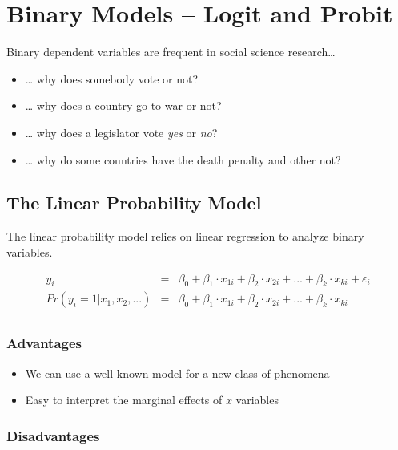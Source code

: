 \documentclass[]{article}
\providecommand{\tightlist}{%
  \setlength{\itemsep}{0pt}\setlength{\parskip}{0pt}}
\theoremstyle{definition}
\theoremstyle{definition}
\theoremstyle{remark}
\begin{document}
\section{Binary Models -- Logit and
Probit}\label{binary-models-logit-and-probit}

Binary dependent variables are frequent in social science
research\ldots{}

\begin{itemize}
\tightlist
\item
  \ldots{} why does somebody vote or not?
\item
  \ldots{} why does a country go to war or not?
\item
  \ldots{} why does a legislator vote \emph{yes} or \emph{no}?
\item
  \ldots{} why do some countries have the death penalty and other not?
\end{itemize}

\subsection{The Linear Probability
Model}\label{the-linear-probability-model}

The linear probability model relies on linear regression to analyze
binary variables.

\begin{eqnarray}
y_i & = & \beta_0 + \beta_1 \cdot x_{1i} + \beta_2 \cdot x_{2i}+ ... + \beta_k \cdot x_{ki} + \varepsilon_{i}\\
Pr(y_i=1|x_1, x_2, ...) & = & \beta_0 + \beta_1 \cdot x_{1i} + \beta_2 \cdot x_{2i}+ ... + \beta_k \cdot x_{ki} \\
\end{eqnarray}

\subsubsection{Advantages}\label{advantages}

\begin{itemize}
\tightlist
\item
  We can use a well-known model for a new class of phenomena
\item
  Easy to interpret the marginal effects of \(x\) variables
\end{itemize}

\subsubsection{Disadvantages}\label{disadvantages}
\end{document}
